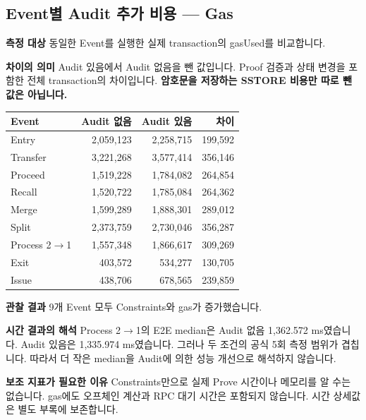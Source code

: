 \documentclass[11pt,a4paper]{article}
\begin{document}
\par\noindent\begin{minipage}{\linewidth}
\subsection*{Event별 Audit 추가 비용 — Gas}
\textbf{측정 대상}\newline
동일한 Event를 실행한 실제 transaction의 gasUsed를 비교합니다.\par\smallskip
\textbf{차이의 의미}\newline
Audit 있음에서 Audit 없음을 뺀 값입니다.\newline
Proof 검증과 상태 변경을 포함한 전체 transaction의 차이입니다.\newline
\textbf{암호문을 저장하는 SSTORE 비용만 따로 뺀 값은 아닙니다.}\par\smallskip
\begin{center}\small\begin{tabular}{@{}lrrr@{}}\toprule
\textbf{Event} & \textbf{Audit 없음} & \textbf{Audit 있음} & \textbf{차이} \\
\midrule
Entry & 2,059,123 & 2,258,715 & 199,592 \\
Transfer & 3,221,268 & 3,577,414 & 356,146 \\
Proceed & 1,519,228 & 1,784,082 & 264,854 \\
Recall & 1,520,722 & 1,785,084 & 264,362 \\
Merge & 1,599,289 & 1,888,301 & 289,012 \\
Split & 2,373,759 & 2,730,046 & 356,287 \\
Process 2$\rightarrow$1 & 1,557,348 & 1,866,617 & 309,269 \\
Exit & 403,572 & 534,277 & 130,705 \\
Issue & 438,706 & 678,565 & 239,859 \\
\bottomrule\end{tabular}\end{center}
\end{minipage}\par\medskip
\textbf{관찰 결과}\newline
9개 Event 모두 Constraints와 gas가 증가했습니다.\par\smallskip
\textbf{시간 결과의 해석}\newline
Process 2$\rightarrow$1의 E2E median은 Audit 없음 1,362.572 ms였습니다.\newline
Audit 있음은 1,335.974 ms였습니다.\newline
그러나 두 조건의 공식 5회 측정 범위가 겹칩니다.\newline
따라서 더 작은 median을 Audit에 의한 성능 개선으로 해석하지 않습니다.\par\smallskip
\textbf{보조 지표가 필요한 이유}\newline
Constraints만으로 실제 Prove 시간이나 메모리를 알 수는 없습니다.\newline
gas에도 오프체인 계산과 RPC 대기 시간은 포함되지 않습니다.\newline
시간 상세값은 별도 부록에 보존합니다.
\end{document}
